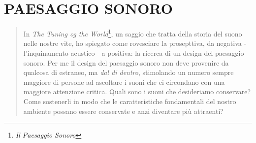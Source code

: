 
\chapter{PAESAGGIO SONORO}
\startcontents[chapters]


\begin{quote}
  In \emph{The Tuning og the World}\footnote{\emph{Il Paesaggio Sonoro}}, un saggio
  che tratta della storia del suono nelle nostre vite, ho spiegato come rovesciare
  la prosepttiva, da negativa - l'inquinamento acustico - a positiva: la ricerca di
  un design del paesaggio sonoro. Per me il design del paesaggio sonoro non deve
  provenire da qualcosa di estraneo, ma \emph{dal di dentro}, stimolando un numero
  sempre maggiore di persone ad ascoltare i suoni che ci circondano con una
  maggiore attenzione critica. Quali sono i suoni che desideriamo conservare?
  Come sostenerli in modo che le caratteristiche fondamentali del nostro ambiente
  possano essere conservate e anzi diventare più attraenti?
\end{quote}

